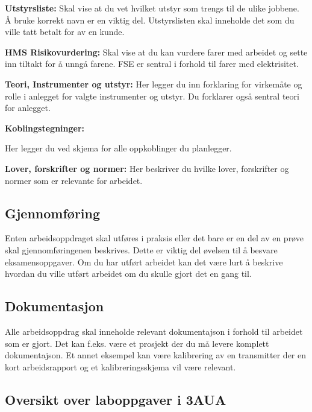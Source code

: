 \vskip 10pt 
\textbf{Utstyrsliste:}
\vskip 10pt 
Skal vise at du vet hvilket utstyr som trengs til de ulike jobbene. Å bruke korrekt navn er en viktig del. Utstyrslisten skal inneholde det som du ville tatt betalt for av en kunde. 

\vskip 10pt 
\textbf{HMS Risikovurdering:}
\vskip 10pt 
Skal vise at du kan vurdere farer med arbeidet og sette inn tiltakt for å unngå farene. FSE er sentral i forhold til farer med elektrisitet. 

\vskip 5pt 
\vskip 10pt 
\textbf{Teori, Instrumenter og utstyr:}
\vskip 10pt 
\vskip 5pt 
Her legger du inn forklaring for virkemåte og rolle i anlegget for valgte instrumenter og utstyr. Du forklarer også sentral teori for anlegget.

\vskip 5pt 
\textbf{Koblingstegninger:}

Her legger du ved skjema for alle oppkoblinger du planlegger. 

\vskip 10pt 
\vskip 10pt 
\textbf{Lover, forskrifter og normer:}
\vskip 10pt 
Her beskriver du hvilke lover, forskrifter og normer som er relevante for arbeidet. 
\subsection{Gjennomføring}

Enten arbeidsoppdraget skal utføres i praksis eller det bare er en del av en prøve skal gjennomføringenen beskrives. Dette er viktig del øvelsen til å besvare eksamensoppgaver. 
\vskip 5pt 
Om du har utført arbeidet kan det være lurt å beskrive hvordan du ville utført arbeidet om du skulle gjort det en gang til. 
\subsection{Dokumentasjon}

\vskip 5pt 
Alle arbeidsoppdrag skal inneholde relevant dokumentajson i forhold til arbeidet som er gjort. Det kan f.eks. være et prosjekt der du må levere komplett dokumentajson. Et annet eksempel kan være kalibrering av en transmitter der en kort arbeidsrapport og et kalibreringsskjema vil være relevant. 

\subsection{Oversikt over laboppgaver i 3AUA}

